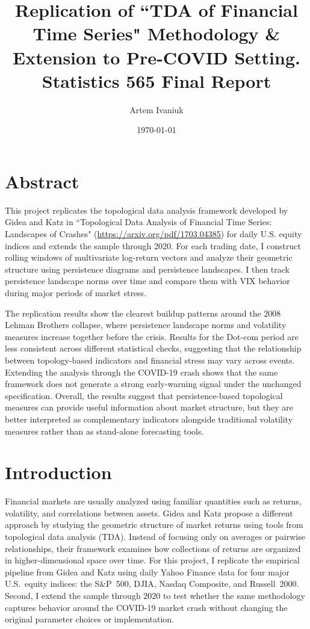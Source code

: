 \documentclass{article}
\title{Replication of ``TDA of Financial Time Series" Methodology \& Extension to Pre-COVID Setting.\\
Statistics 565 Final Report}
\author{Artem Ivaniuk}
\date{\today}
\begin{document}
\maketitle

\section*{Abstract}
This project replicates the topological data analysis framework developed by Gidea and Katz in ``Topological Data Analysis of Financial Time Series:
Landscapes of Crashes" (\url{https://arxiv.org/pdf/1703.04385}) for daily U.S. equity indices and extends the sample through 2020. For each trading date, I construct rolling windows of multivariate log-return vectors and analyze their geometric structure using persistence diagrams and persistence landscapes. I then track persistence landscape norms over time and compare them with VIX behavior during major periods of market stress.

The replication results show the clearest buildup patterns around the 2008 Lehman Brothers collapse, where persistence landscape norms and volatility measures increase together before the crisis. Results for the Dot-com period are less consistent across different statistical checks, suggesting that the relationship between topology-based indicators and financial stress may vary across events. Extending the analysis through the COVID-19 crash shows that the same framework does not generate a strong early-warning signal under the unchanged specification. Overall, the results suggest that persistence-based topological measures can provide useful information about market structure, but they are better interpreted as complementary indicators alongside traditional volatility measures rather than as stand-alone forecasting tools.

\section{Introduction}
Financial markets are usually analyzed using familiar quantities such as returns, volatility, and correlations between assets. Gidea and Katz propose a different approach by studying the geometric structure of market returns using tools from topological data analysis (TDA). Instead of focusing only on averages or pairwise relationships, their framework examines how collections of returns are organized in higher-dimensional space over time. For this project, I replicate the empirical pipeline from Gidea and Katz using daily Yahoo Finance data for four major U.S.\ equity indices: the S\&P~500, DJIA, Nasdaq Composite, and Russell~2000. Second, I extend the sample through 2020 to test whether the same methodology captures behavior around the COVID-19 market crash without changing the original parameter choices or implementation.
\end{document}
